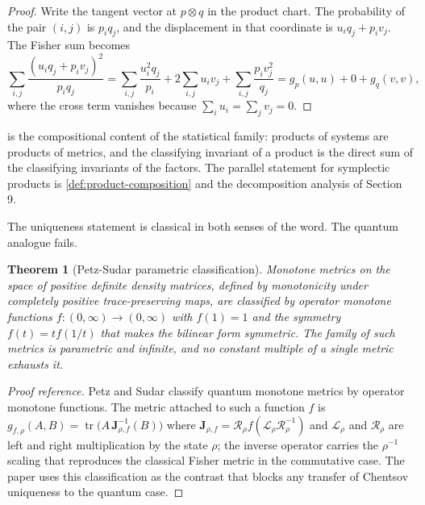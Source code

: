 \documentclass[11pt,letterpaper]{article}
\newtheorem{theorem}{Theorem}[section]
\theoremstyle{definition}
\theoremstyle{remark}
\begin{document}
\begin{proof}
Write the tangent vector at $p \otimes q$ in the product chart. The probability of the pair $(i, j)$ is $p_i q_j$, and the displacement in that coordinate is $u_i q_j + p_i v_j$. The Fisher sum becomes
\[
\sum_{i, j} \frac{(u_i q_j + p_i v_j)^{2}}{p_i q_j}
= \sum_{i, j} \frac{u_i^{2} q_j}{p_i} + 2 \sum_{i, j} u_i v_j + \sum_{i, j} \frac{p_i v_j^{2}}{q_j}
= g_{p}(u, u) + 0 + g_{q}(v, v),
\]
where the cross term vanishes because $\sum_i u_i = \sum_j v_j = 0$.
\end{proof}

 is the compositional content of the statistical family: products of systems are products of metrics, and the classifying invariant of a product is the direct sum of the classifying invariants of the factors. The parallel statement for symplectic products is \cref{def:product-composition} and the decomposition analysis of Section 9.

The uniqueness statement is classical in both senses of the word. The quantum analogue fails.

\begin{theorem}[Petz-Sudar parametric classification]
\label{thm:petz-sudar}
Monotone metrics on the space of positive definite density matrices, defined by monotonicity under completely positive trace-preserving maps, are classified by operator monotone functions $f : (0, \infty) \to (0, \infty)$ with $f(1) = 1$ and the symmetry $f(t) = t f(1/t)$ that makes the bilinear form symmetric. The family of such metrics is parametric and infinite, and no constant multiple of a single metric exhausts it.
\end{theorem}

\begin{proof}[Proof reference]
Petz and Sudar \cite{petz-sudar} classify quantum monotone metrics by operator monotone functions. The metric attached to such a function $f$ is $g_{f, \rho}(A, B) = \operatorname{tr} \big( A \, \mathbf{J}_{\rho, f}^{-1}(B) \big)$ where $\mathbf{J}_{\rho, f} = \mathcal{R}_{\rho} f(\mathcal{L}_{\rho} \mathcal{R}_{\rho}^{-1})$ and $\mathcal{L}_{\rho}$ and $\mathcal{R}_{\rho}$ are left and right multiplication by the state $\rho$; the inverse operator carries the $\rho^{-1}$ scaling that reproduces the classical Fisher metric in the commutative case. The paper uses this classification as the contrast that blocks any transfer of Chentsov uniqueness to the quantum case.
\end{proof}
\end{document}
